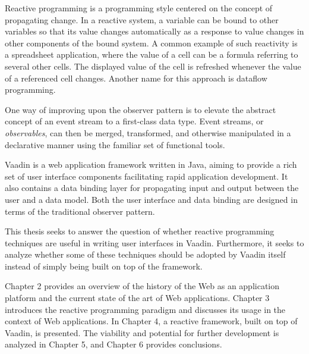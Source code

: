 Reactive programming is a programming style centered on the concept of propagating change. In a reactive system, a variable can be bound to other variables so that its value changes automatically as a response to value changes in other components of the bound system. A common example of such reactivity is a spreadsheet application, where the value of a cell can be a formula referring to several other cells. The displayed value of the cell is refreshed whenever the value of a referenced cell changes. Another name for this approach is dataflow programming.

One way of improving upon the observer pattern is to elevate the abstract concept of an event stream to a first-class data type. Event streams, or \emph{observables}, can then be merged, transformed, and otherwise manipulated in a declarative manner using the familiar set of functional tools.

Vaadin is a web application framework written in Java, aiming to provide a rich set of user interface components facilitating rapid application development. It also contains a data binding layer for propagating input and output between the user and a data model. Both the user interface and data binding are designed in terms of the traditional observer pattern. 

This thesis seeks to answer the question of whether reactive programming techniques are useful in writing user interfaces in Vaadin. Furthermore, it seeks to analyze whether some of these techniques should be adopted by Vaadin itself instead of simply being built on top of the framework.

Chapter 2 provides an overview of the history of the Web as an application platform and the current state of the art of Web applications. Chapter 3 introduces the reactive programming paradigm and discusses its usage in the context of Web applications. In Chapter 4, a reactive framework, built on top of Vaadin, is presented. The viability and potential for further development is analyzed in Chapter 5, and Chapter 6 provides conclusions.